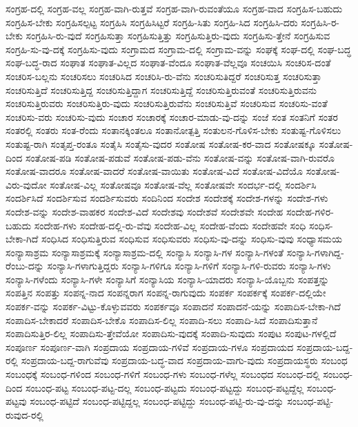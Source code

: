 {ಸಂಗ್ರಹ-ದಲ್ಲಿ
ಸಂಗ್ರಹ-ವಲ್ಲ
ಸಂಗ್ರಹ-ವಾಗಿ-ರುತ್ತವೆ
ಸಂಗ್ರಹ-ವಾಗಿ-ರುವಂತೆಯೂ
ಸಂಗ್ರಹ-ವಾದ
ಸಂಗ್ರಹಿಸ-ಬಹುದು
ಸಂಗ್ರಹಿಸ-ಬೇಕು
ಸಂಗ್ರಹಿಸಲ್ಪಟ್ಟ
ಸಂಗ್ರಹಿಸಿ
ಸಂಗ್ರಹಿಸಿಟ್ಟರೆ
ಸಂಗ್ರಹಿ-ಸಿತು
ಸಂಗ್ರಹಿ-ಸಿದ
ಸಂಗ್ರಹಿಸಿ-ದರು
ಸಂಗ್ರಹಿಸಿ-ರ-ಬೇಕು
ಸಂಗ್ರಹಿಸಿ-ರು-ವುದೆ
ಸಂಗ್ರಹಿಸುತ್ತಾ
ಸಂಗ್ರಹಿಸುತ್ತಿತ್ತು
ಸಂಗ್ರಹಿಸುತ್ತಿರು-ವುದು
ಸಂಗ್ರಹಿಸು-ತ್ತೇನೆ
ಸಂಗ್ರಹಿಸುವ
ಸಂಗ್ರಹಿ-ಸು-ವು-ದಕ್ಕೆ
ಸಂಗ್ರಹಿಸು-ವುದು
ಸಂಗ್ರಾಮದ
ಸಂಗ್ರಾಮ-ದಲ್ಲಿ
ಸಂಗ್ರಾಮ-ವನ್ನು
ಸಂಘಕ್ಕೆ
ಸಂಘ-ದಲ್ಲಿ
ಸಂಘ-ಬದ್ಧ
ಸಂಘ-ಬದ್ಧ-ರಾದ
ಸಂಘಾತ
ಸಂಘಾತ-ವಿಲ್ಲದ
ಸಂಘಾತ-ವೆಂದೂ
ಸಂಘಾತ-ವೆಲ್ಲವೂ
ಸಂಚಯಿಸಿ
ಸಂಚರಿಸ-ದಂತೆ
ಸಂಚರಿಸ-ಬಲ್ಲನು
ಸಂಚರಿಸಲು
ಸಂಚರಿಸಿದ
ಸಂಚರಿಸಿ-ರು-ವೆನು
ಸಂಚರಿಸುತಿದ್ದರೆ
ಸಂಚರಿಸುತ್ತ
ಸಂಚರಿಸುತ್ತಾ
ಸಂಚರಿಸುತ್ತಿದೆ
ಸಂಚರಿಸುತ್ತಿದ್ದ
ಸಂಚರಿಸುತ್ತಿದ್ದಾಗ
ಸಂಚರಿಸುತ್ತಿದ್ದೆ
ಸಂಚರಿಸುತ್ತಿರುವಂತೆ
ಸಂಚರಿಸುತ್ತಿರುವನು
ಸಂಚರಿಸುತ್ತಿರುವರು
ಸಂಚರಿಸುತ್ತಿರು-ವುದು
ಸಂಚರಿಸುತ್ತಿರುವೆನು
ಸಂಚರಿಸುತ್ತಿವೆ
ಸಂಚರಿಸುವ
ಸಂಚರಿಸು-ವಂತೆ
ಸಂಚರಿಸು-ವರು
ಸಂಚರಿಸು-ವುದು
ಸಂಚಾರ
ಸಂಚಾರಕ್ಕೆ
ಸಂಚಾರ-ಮಾಡು-ವು-ದನ್ನು
ಸಂಜೆ
ಸಂತ
ಸಂತನಿಗೆ
ಸಂತರ
ಸಂತರಲ್ಲಿ
ಸಂತರು
ಸಂತ-ರೆಂದು
ಸಂತಾನಕ್ಕಿಂತಲೂ
ಸಂತಾನೋತ್ಪತ್ತಿ
ಸಂತುಲನ-ಗೊಳಿಸ-ಬೇಕು
ಸಂತುಷ್ಟ-ಗೊಳಿಸಲು
ಸಂತುಷ್ಟ-ರಾಗಿ
ಸಂತೃಪ್ತ-ರಂತೂ
ಸಂತೈಸಿ
ಸಂತೈಸು-ವುದರ
ಸಂತೋಷ
ಸಂತೋಷ-ಕರ-ವಾದ
ಸಂತೋಷಕ್ಕೂ
ಸಂತೋಷ-ದಿಂದ
ಸಂತೋಷ-ಪಡಿ
ಸಂತೋಷ-ಪಡುವೆ
ಸಂತೋಷ-ಪಡು-ವೆನು
ಸಂತೋಷ-ವನ್ನು
ಸಂತೋಷ-ವಾಗಿ-ರುವರೊ
ಸಂತೋಷ-ವಾದರೂ
ಸಂತೋಷ-ವಾದರೆ
ಸಂತೋಷ-ವಾಯಿತು
ಸಂತೋಷ-ವಿದೆ
ಸಂತೋಷ-ವಿದೆಯೊ
ಸಂತೋಷ-ವಿರು-ವುದೋ
ಸಂತೋಷ-ವಿಲ್ಲ
ಸಂತೋಷವೂ
ಸಂತೋಷ-ವೆಲ್ಲ
ಸಂತೋಷವೇ
ಸಂದರ್ಭ-ದಲ್ಲಿ
ಸಂದರ್ಶಿಸಿ
ಸಂದರ್ಶಿಸಿದೆ
ಸಂದರ್ಶಿಸುವ
ಸಂದರ್ಶಿಸುವರು
ಸಂದಿನಿಂದ
ಸಂದೇಶ
ಸಂದೇಶಕ್ಕೆ
ಸಂದೇಶ-ಗಳನ್ನು
ಸಂದೇಶ-ಗಳು
ಸಂದೇಶ-ವನ್ನು
ಸಂದೇಶ-ವಾಹಕರ
ಸಂದೇಶ-ವಿದೆ
ಸಂದೇಶವು
ಸಂದೇಶವೆ
ಸಂದೇಶವೇ
ಸಂದೇಹ
ಸಂದೇಹ-ಗಳಿರ-ಬಹುದು
ಸಂದೇಹ-ಗಳು
ಸಂದೇಹ-ದಲ್ಲಿ-ರು-ವೆವು
ಸಂದೇಹ-ವಿಲ್ಲ
ಸಂದೇಹ-ವೆಂದು
ಸಂದೇಹವೇ
ಸಂಧಿ
ಸಂಧಿಸ-ಬೇಕಾ-ಗಿದೆ
ಸಂಧಿಸಿದ
ಸಂಧಿಸುತ್ತಿರುವ
ಸಂಧಿಸುವ
ಸಂಧಿಸುವರು
ಸಂಧಿಸು-ವು-ದನ್ನು
ಸಂಧಿಸು-ವುವು
ಸಂಧ್ಯಾಸಮಯ
ಸಂನ್ಯಾಸಾಶ್ರಮ
ಸಂನ್ಯಾಸಾಶ್ರಮಕ್ಕೆ
ಸಂನ್ಯಾಸಾಶ್ರಮ-ದಲ್ಲಿ
ಸಂನ್ಯಾಸಿ
ಸಂನ್ಯಾಸಿ-ಗಳ
ಸಂನ್ಯಾಸಿ-ಗಳಂತೆ
ಸಂನ್ಯಾಸಿ-ಗಳಾಗಿದ್ದ-ರೆಂಬು-ದನ್ನು
ಸಂನ್ಯಾಸಿ-ಗಳಾಗುತ್ತಿದ್ದರು
ಸಂನ್ಯಾಸಿ-ಗಳಿಗೂ
ಸಂನ್ಯಾಸಿ-ಗಳಿಗೆ
ಸಂನ್ಯಾಸಿ-ಗಳಿ-ರುವರು
ಸಂನ್ಯಾಸಿ-ಗಳು
ಸಂನ್ಯಾಸಿ-ಗಳೆಂದು
ಸಂನ್ಯಾಸಿ-ಗಳೇ
ಸಂನ್ಯಾಸಿಗೆ
ಸಂನ್ಯಾಸಿಯ
ಸಂನ್ಯಾಸಿ-ಯಾದರು
ಸಂನ್ಯಾಸಿ-ಯೊಬ್ಬನು
ಸಂಪತ್ತನ್ನು
ಸಂಪತ್ತಿನ
ಸಂಪತ್ತು
ಸಂಪನ್ನ-ನಾದ
ಸಂಪನ್ನರಾಗ
ಸಂಪನ್ನ-ರಾಗುವುದು
ಸಂಪರ್ಕ
ಸಂಪರ್ಕಕ್ಕೆ
ಸಂಪರ್ಕ-ದಲ್ಲಿಯೇ
ಸಂಪರ್ಕ-ವನ್ನು
ಸಂಪರ್ಕ-ವಿಟ್ಟು-ಕೊಳ್ಳುವವರು
ಸಂಪರ್ಕವೂ
ಸಂಪಾದನೆ
ಸಂಪಾದನೆ-ಯನ್ನು
ಸಂಪಾದಿಸ-ಬೇಕಾ-ಗಿದೆ
ಸಂಪಾದಿಸ-ಬೇಕಾದರೆ
ಸಂಪಾದಿಸ-ಬೇಕೊ
ಸಂಪಾದಿಸ-ಲಿಲ್ಲ
ಸಂಪಾದಿ-ಸಲು
ಸಂಪಾದಿ-ಸಿದೆ
ಸಂಪಾದಿಸುತ್ತಾನೆ
ಸಂಪಾದಿಸುತ್ತಿರ-ಲಿಲ್ಲ
ಸಂಪಾದಿಸು-ತ್ತೇವೆಯೋ
ಸಂಪಾದಿಸು-ವುದಕ್ಕೆ
ಸಂಪಾದಿ-ಸುವುದು
ಸಂಪುಟ
ಸಂಪುಟ-ಗಳಲ್ಲಿದೆ
ಸಂಪೂರ್ಣ
ಸಂಪೂರ್ಣ-ವಾಗಿ
ಸಂಪ್ರದಾಯ
ಸಂಪ್ರದಾಯ-ಗಳಿವೆ
ಸಂಪ್ರದಾಯ-ಗಳೂ
ಸಂಪ್ರದಾಯದ
ಸಂಪ್ರದಾಯ-ಬದ್ದ-ರಲ್ಲಿ
ಸಂಪ್ರದಾಯ-ಬದ್ದ-ರಾಗುವೆವು
ಸಂಪ್ರದಾಯ-ಬದ್ಧ-ವಾದ
ಸಂಪ್ರದಾಯ-ವಾಗು-ವುದು
ಸಂಪ್ರದಾಯಸ್ಥರು
ಸಂಬಂಧ
ಸಂಬಂಧಕ್ಕೆ
ಸಂಬಂಧ-ಗಳಿಂದ
ಸಂಬಂಧ-ಗಳಿಗೆ
ಸಂಬಂಧ-ಗಳು
ಸಂಬಂಧ-ಗಳೆಲ್ಲ
ಸಂಬಂಧದ
ಸಂಬಂಧ-ದಲ್ಲಿ
ಸಂಬಂಧ-ದಿಂದ
ಸಂಬಂಧ-ಪಟ್ಟ
ಸಂಬಂಧ-ಪಟ್ಟ-ದಲ್ಲ
ಸಂಬಂಧ-ಪಟ್ಟದು
ಸಂಬಂಧ-ಪಟ್ಟದ್ದು
ಸಂಬಂಧ-ಪಟ್ಟದ್ದೆಲ್ಲ
ಸಂಬಂಧ-ಪಟ್ಟವು
ಸಂಬಂಧ-ಪಟ್ಟಿದೆ
ಸಂಬಂಧ-ಪಟ್ಟಿದ್ದಲ್ಲ
ಸಂಬಂಧ-ಪಟ್ಟಿದ್ದು
ಸಂಬಂಧ-ಪಟ್ಟಿ-ರು-ವು-ದನ್ನು
ಸಂಬಂಧ-ಪಟ್ಟಿ-ರುವುದ-ರಲ್ಲಿ
}

